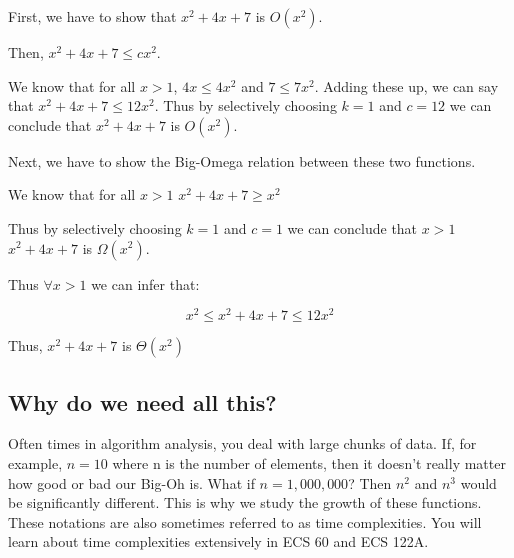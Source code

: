 \begin{solution}
    First, we have to show that $x^{2} + 4x + 7$ is $O(x^{2})$.

    Then, $x^{2} + 4x + 7 \leq cx^{2}$.

    We know that for all $x > 1$, $4x \leq 4x^{2}$ and $7 \leq 7x^{2}$. Adding
    these up, we can say that $x^{2} + 4x + 7 \leq 12x^{2}$. Thus by
    selectively choosing $k = 1$ and $c = 12$ we can conclude that $x^{2} + 4x
    + 7$ is $O(x^{2})$.

    Next, we have to show the Big-Omega relation between these two functions.

    We know that for all $x > 1$ $x^{2} + 4x + 7 \geq x^{2}$

    Thus by selectively choosing $k = 1$ and $c = 1$ we can
    conclude that $x > 1$ $x^{2} + 4x + 7$ is $\Omega(x^{2})$.

    Thus $\forall x > 1$ we can infer that:

    \[
        x^{2} \leq x^{2} + 4x + 7 \leq 12x^{2}
    \]

    Thus, $x^{2} + 4x + 7$ is $\Theta(x^{2})$
\end{solution}

\subsection{Why do we need all this?}
Often times in algorithm analysis, you deal with large chunks of data. If, for
example, $n = 10$ where n is the number of elements, then it doesn't really
matter how good or bad our Big-Oh is. What if $n = 1,000,000$? Then $n^{2}$ and
$n^{3}$ would be significantly different. This is why we study the growth of
these functions. These notations are also sometimes referred to as time
complexities. You will learn about time complexities extensively in ECS 60 and
ECS 122A.
